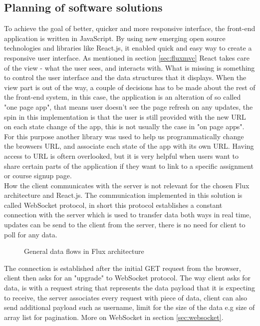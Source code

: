 \subsection{Planning of software solutions}\label{sec:softwaresolution}
To achieve the goal of better, quicker and more responsive interface, the front-end application is written in JavaScript. By using new emerging open source technologies and libraries like React.js, it enabled quick and easy way to create a responsive user interface. As mentioned in section \ref{sec:fluxmvc} React takes care of the view - what the user sees, and interacts with. What is missing is something to control the user interface and the data structures that it displays. When the view part is out of the way, a couple of decisions has to be made about the rest of the front-end system, in this case, the application is an alteration of so called "one page app", that means user doesn't see the page refresh on any updates, the spin in this implementation is that the user is still provided with the new URL on each state change of the app, this is not usually the case in "on page apps". For this purpose another library was used to help us programmatically change the browsers URL, and associate each state of the app with its own URL. Having access to URL is oftern overlooked, but it is very helpful when users want to share certain parts of the application if they want to link to a specific assignment or course signup page.
\\How the client communicates with the server is not relevant for the chosen Flux architecture and React.js. The communication implemented in this solution is called WebSocket protocol, in short this protocol establishes a constant connection with the server which is used to transfer data both ways in real time, updates can be send to the client from the server, there is no need for client to poll for any data.
\begin{figure}[h]
\centering

\caption{General data flows in Flux architecture}
\end{figure}
 The connection is established after the initial GET request from the browser, client then asks for an "upgrade" to WebSocket protocol. The way client asks for data, is with a request string that represents the data payload that it is expecting to receive, the server associates every request with piece of data, client can also send additional payload such as username, limit for the size of the data e.g size of array list for pagination. More on WebSocket in section \ref{sec:websocket}.
